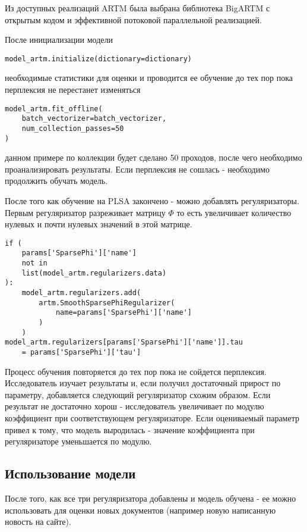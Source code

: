 Из доступных реализаций ARTM была выбрана библиотека BigARTM с открытым кодом и эффективной потоковой параллельной реализацией. 

После инициализации модели

\begin{lstlisting}
model_artm.initialize(dictionary=dictionary)
\end{lstlisting}

 необходимые статистики для оценки и проводится ее обучение до тех пор пока перплексия не перестанет изменяться

\begin{lstlisting}
model_artm.fit_offline(
    batch_vectorizer=batch_vectorizer, 
    num_collection_passes=50
)
\end{lstlisting}

 данном примере по коллекции будет сделано 50 проходов, после чего необходимо проанализировать результаты. Если перплексия не сошлась - необходимо продолжить обучать модель.

После того как обучение на PLSA закончено - можно добавлять регуляризаторы. Первым регуляризатор разреживает матрицу $\Phi$ то есть увеличивает количество нулевых и почти нулевых значений в этой матрице.

\begin{lstlisting}
if (
    params['SparsePhi']['name'] 
    not in 
    list(model_artm.regularizers.data)
):
    model_artm.regularizers.add(
        artm.SmoothSparsePhiRegularizer(
            name=params['SparsePhi']['name']
        )
    )
model_artm.regularizers[params['SparsePhi']['name']].tau 
    = params['SparsePhi']['tau']
\end{lstlisting}

Процесс обучения повторяется до тех пор пока не сойдется перплексия. Исследователь изучает результаты и, если получил достаточный прирост по параметру, добавляется следующий регуляризатор схожим образом. Если результат не достаточно хорош - исследователь увеличивает по модулю коэффициент при соответствующем регуляризаторе. Если оцениваемый параметр привел к тому, что модель выродилась - значение коэффициента при регуляризаторе уменьшается по модулю.

\subsection{Использование модели}

После того, как все три регуляризатора добавлены и модель обучена - ее можно использовать для оценки новых документов (например новую написанную новость на сайте).

